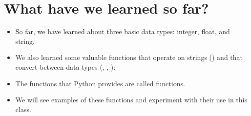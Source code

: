 \documentclass[letterpaper,10pt,english]{sphinxmanual}
\begin{document}
\section{What have we learned so far?}
\label{\detokenize{lecture_notes/lec04_modules_functions1:what-have-we-learned-so-far}}\begin{itemize}
\item {} 
So far, we have learned about three basic data types: integer, float,
and string.

\item {} 
We also learned some valuable functions that operate on strings
() and that convert between data types (, , ):
\begin{quote}

\begin{sphinxVerbatim}[commandchars=\\\{\}]
  
\end{sphinxVerbatim}
\end{quote}

\item {} 
The functions that Python provides are called  functions.

\item {} 
We will see examples of these functions and experiment with their
use in this class.

\end{itemize}
\end{document}
